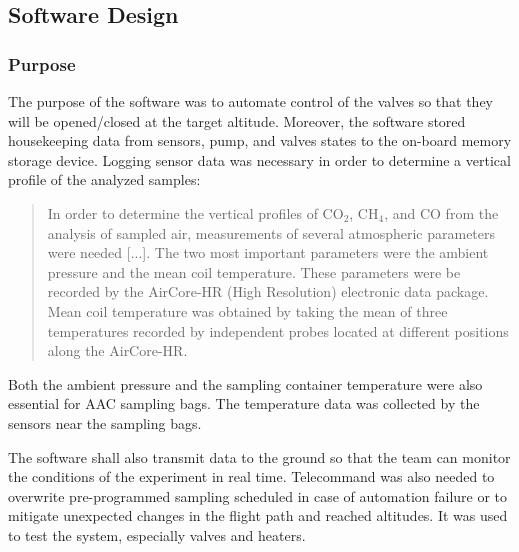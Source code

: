 \pagebreak
\subsection{Software Design}
\subsubsection{Purpose}
The purpose of the software was to automate control of the valves so that they will be opened/closed at the target altitude. Moreover, the software stored housekeeping data from sensors, pump, and valves states to the on-board memory storage device. Logging sensor data was necessary in order to determine a vertical profile of the analyzed samples:

\begin{quote}
In order to determine the vertical profiles of CO$_2$, CH$_4$, and CO from the analysis of sampled air, measurements of several atmospheric parameters were needed [...]. The two most important parameters were the ambient pressure and the mean coil temperature. These parameters were be recorded by the AirCore-HR (High Resolution) electronic data package. Mean coil temperature was obtained by taking the mean of three temperatures recorded by independent probes located at different positions along the AirCore-HR.\cite{Membrive}
\end{quote}

Both the ambient pressure and the sampling container temperature were also essential for AAC sampling bags. The temperature data was collected by the sensors near the sampling bags.

The software shall also transmit data to the ground so that the team can monitor the conditions of the experiment in real time. Telecommand was also needed to overwrite pre-programmed sampling scheduled in case of automation failure or to mitigate unexpected changes in the flight path and reached altitudes. It was used to test the system, especially valves and heaters.\par

